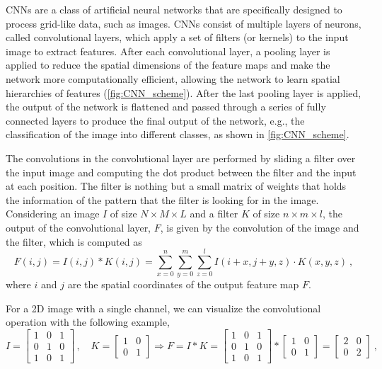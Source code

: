 CNNs are a class of artificial neural networks that are specifically
designed
to process grid-like data, such as images. CNNs consist of multiple layers of
neurons, called convolutional layers, which apply a set of filters (or
kernels)
to the input image to extract features. After each convolutional layer, a
pooling layer is applied to reduce the spatial dimensions of the feature maps
and make the network more computationally efficient, allowing the network to
learn spatial hierarchies of features (\cref{fig:CNN_scheme}). After the last
pooling layer is applied, the output of the network is flattened and passed
through a series of fully connected layers to produce the final output of the
network, e.g., the classification of the image into different classes, as shown
in \cref{fig:CNN_scheme}.

The convolutions in the convolutional layer are performed by sliding a filter
over the input image and computing the dot product between the filter and the
input at each position. The filter is nothing but a small matrix of weights
that holds the information of the pattern that the filter is looking for in
the
image. Considering an image $I$ of size $N \times M \times L$ and a filter
$K$
of size $n \times m \times l$, the output of the convolutional layer, $F$, is
given by the convolution of the image and the filter, which is computed as
\begin{equation}
  F(i, j) = I(i, j) \ast K(i,
  j)=\sum_{x=0}^{n}\sum_{y=0}^{m}\sum_{z=0}^{l}I(i+x,
  j+y, z)\cdot K(x, y,z) \ ,
\end{equation}
where $i$ and $j$ are the spatial coordinates of the output feature map $F$.

For a 2D image with a single channel, we can visualize the convolutional
operation with the following example,
\begin{equation}
  I = \begin{bmatrix}
    1 & 0 & 1 \\
    0 & 1 & 0 \\
    1 & 0 & 1
  \end{bmatrix} \, ,
  \quad
  K = \begin{bmatrix}
    1 & 0 \\
    0 & 1
  \end{bmatrix}
  \Longrightarrow
  F=I \ast K =
  \begin{bmatrix}
    1 & 0 & 1 \\
    0 & 1 & 0 \\
    1 & 0 & 1
  \end{bmatrix}
  \ast
  \begin{bmatrix}
    1 & 0 \\
    0 & 1
  \end{bmatrix}
  =
  \begin{bmatrix}
    2 & 0 \\
    0 & 2
  \end{bmatrix}
  \ ,
\end{equation}

